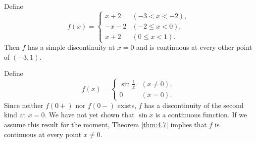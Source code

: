 {\begin{asparaenum}[(a)]
    \item Define 
    \begin{equation*}
        f(x) = \left\{
            \begin{array}{lc}
                 x + 2  & (-3 <    x < -2),\\
                -x - 2  & (-2 \leq x <  0),\\
                 x + 2  & ( 0 \leq x <  1).
            \end{array}
        \right.
    \end{equation*}
    Then $f$ has a simple discontinuity at $x = 0$ and is continuous at every other point of $(-3, 1)$.
    \item Define
    \begin{equation*}
        f(x) = \left\{
            \begin{array}{lc}
                \sin \frac{1}{x} & (x \neq 0),\\
                0 & (x = 0).
            \end{array}
        \right.
    \end{equation*}
    Since neither $f(0+)$ nor $f(0-)$ exists,
    $f$ has a discontinuity of the second kind at $x = 0$. 
    We have not yet shown that $\sin x$ is a continuous function. 
    If we assume this result for the moment, 
    Theorem \ref{thm:4.7} implies that $f$ is continuous at every point $x \neq 0$.
\end{asparaenum}
}